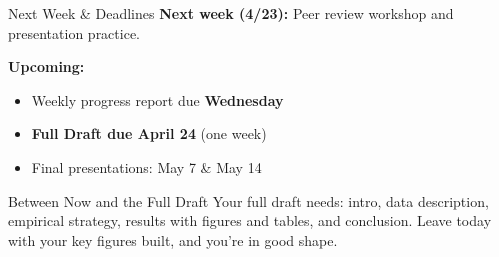 \begin{frame}{Next Week \& Deadlines}
  \textbf{Next week (4/23):} Peer review workshop and presentation practice.

  \vspace{8pt}

  \textbf{Upcoming:}
  \begin{itemize}
    \item Weekly progress report due \textbf{Wednesday}
    \item \textbf{\textcolor{usfgreen}{Full Draft due April 24}} (one week)
    \item Final presentations: May 7 \& May 14
  \end{itemize}

  \vspace{8pt}

  \begin{block}{Between Now and the Full Draft}
    Your full draft needs: intro, data description, empirical strategy, results with figures and tables, and conclusion. Leave today with your key figures built, and you're in good shape.
  \end{block}
\end{frame}


